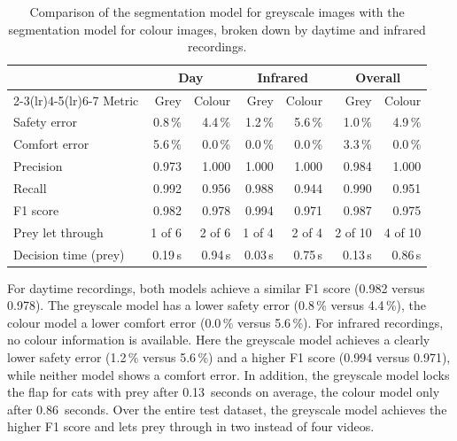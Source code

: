 \begin{table}[H]
    \centering
    \small
    \begin{tabular}{lrrrrrr}
        \toprule
        & \multicolumn{2}{c}{Day} & \multicolumn{2}{c}{Infrared} & \multicolumn{2}{c}{Overall} \\
        \cmidrule(lr){2-3}\cmidrule(lr){4-5}\cmidrule(lr){6-7}
        Metric & Grey & Colour & Grey & Colour & Grey & Colour \\
        \midrule
        Safety error & 0.8\,\% & 4.4\,\% & 1.2\,\% & 5.6\,\% & 1.0\,\% & 4.9\,\% \\
        Comfort error & 5.6\,\% & 0.0\,\% & 0.0\,\% & 0.0\,\% & 3.3\,\% & 0.0\,\% \\
        Precision & 0.973 & 1.000 & 1.000 & 1.000 & 0.984 & 1.000 \\
        Recall & 0.992 & 0.956 & 0.988 & 0.944 & 0.990 & 0.951 \\
        F1 score & 0.982 & 0.978 & 0.994 & 0.971 & 0.987 & 0.975 \\
        Prey let through & 1 of 6 & 2 of 6 & 1 of 4 & 2 of 4 & 2 of 10 & 4 of 10 \\
        Decision time (prey) & 0.19\,s & 0.94\,s & 0.03\,s & 0.75\,s & 0.13\,s & 0.86\,s \\
        \bottomrule
    \end{tabular}
    \caption{Comparison of the segmentation model for greyscale images with the segmentation model for colour images, broken down by daytime and infrared recordings.}
    \label{tab:ablation_gray}
\end{table}

For daytime recordings, both models achieve a similar F1 score (0.982 versus 0.978). The greyscale model has a lower safety error (0.8\,\% versus 4.4\,\%), the colour model a lower comfort error (0.0\,\% versus 5.6\,\%). For infrared recordings, no colour information is available. Here the greyscale model achieves a clearly lower safety error (1.2\,\% versus 5.6\,\%) and a higher F1 score (0.994 versus 0.971), while neither model shows a comfort error. In addition, the greyscale model locks the flap for cats with prey after 0.13~seconds on average, the colour model only after 0.86~seconds. Over the entire test dataset, the greyscale model achieves the higher F1 score and lets prey through in two instead of four videos.

